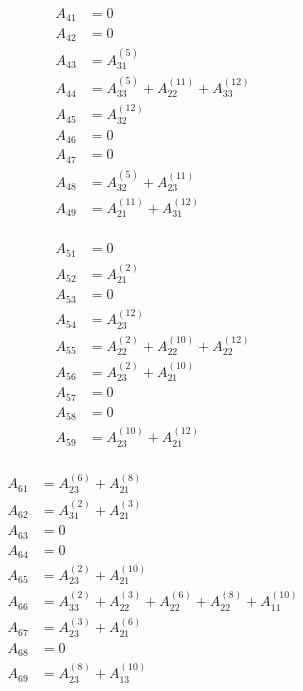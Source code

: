 \documentclass[9pt]{amsart}
\newcommand{\e}[2]{_{#1}^{(#2)}}
\begin{document}
\begin{multicols}{3}
  \begin{align*}
    A_{41}&=0\\
    A_{42}&=0\\
    A_{43}&=A\e{31}{5}\\
    A_{44}&=A\e{33}{5}+A\e{22}{11}+A\e{33}{12}\\
    A_{45}&=A\e{32}{12}\\
    A_{46}&=0\\
    A_{47}&=0\\
    A_{48}&=A\e{32}{5}+A\e{23}{11}\\
    A_{49}&=A\e{21}{11}+A\e{31}{12}\\
  \end{align*}

  \begin{align*}
    A_{51}&=0\\
    A_{52}&=A\e{21}{2}\\
    A_{53}&=0\\
    A_{54}&=A\e{23}{12}\\
    A_{55}&=A\e{22}{2}+A\e{22}{10}+A\e{22}{12}\\
    A_{56}&=A\e{23}{2}+A\e{21}{10}\\
    A_{57}&=0\\
    A_{58}&=0\\
    A_{59}&=A\e{23}{10}+A\e{21}{12}\\
  \end{align*}

  \begin{align*}
    A_{61}&=A\e{23}{6}+A\e{21}{8}\\
    A_{62}&=A\e{31}{2}+A\e{21}{3}\\
    A_{63}&=0\\
    A_{64}&=0\\
    A_{65}&=A\e{23}{2}+A\e{21}{10}\\
    A_{66}&=A\e{33}{2}+A\e{22}{3}+A\e{22}{6}+A\e{22}{8}+A\e{11}{10}\\
    A_{67}&=A\e{23}{3}+A\e{21}{6}\\
    A_{68}&=0\\
    A_{69}&=A\e{23}{8}+A\e{13}{10}\\
  \end{align*}
\end{multicols}
\end{document}
